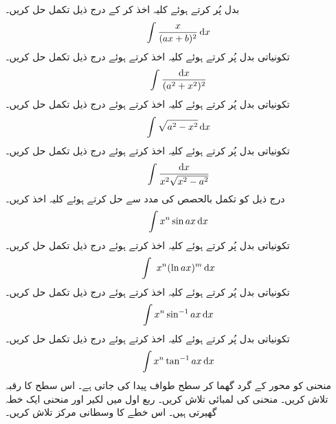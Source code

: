 بدل  پُر کرتے ہوئے کلیہ  اخذ کر کے درج ذیل تکمل حل کریں۔
\begin{align*}
\int\frac{x}{(ax+b)^2}\dif x
\end{align*}
تکونیاتی بدل پُر کرتے ہوئے کلیہ  اخذ کرتے ہوئے درج ذیل تکمل حل کریں۔
\begin{align*}
\int\frac{\dif x}{(a^2+x^2)^2}
\end{align*}
تکونیاتی بدل  پُر کرتے ہوئے کلیہ  اخذ کرتے ہوئے درج ذیل تکمل حل کریں۔
\begin{align*}
\int\sqrt{a^2-x^2}\dif x
\end{align*}
تکونیاتی بدل  پُر کرتے ہوئے کلیہ  اخذ کرتے ہوئے درج ذیل تکمل حل کریں۔
\begin{align*}
\int\frac{\dif x}{x^2\sqrt{x^2-a^2}}
\end{align*}
درج ذیل کو تکمل بالحصص کی مدد سے حل کرتے ہوئے کلیہ  اخذ کریں۔
\begin{align*}
\int x^n \sin ax \dif x
\end{align*}
تکونیاتی بدل  پُر کرتے ہوئے کلیہ  اخذ کرتے ہوئے درج ذیل تکمل حل کریں۔
\begin{align*}
\int\ x^n (\ln ax)^m\dif x
\end{align*}
تکونیاتی بدل  پُر کرتے ہوئے کلیہ  اخذ کرتے ہوئے درج ذیل تکمل حل کریں۔
\begin{align*}
\int x^n\sin^{-1}ax\dif x
\end{align*}
تکونیاتی بدل  پُر کرتے ہوئے کلیہ  اخذ کرتے ہوئے درج ذیل تکمل حل کریں۔
\begin{align*}
\int x^n\tan^{-1} ax\dif x
\end{align*}
منحنی  کو محور  کے گرد گھما کر سطح طواف پیدا کی جاتی ہے۔ اس سطح کا رقبہ تلاش کریں۔
منحنی  کی لمبائی تلاش کریں۔
ربع اول میں لکیر  اور منحنی  ایک خطہ گھیرتی  ہیں۔ اس خطے کا وسطانی مرکز تلاش کریں۔ 

